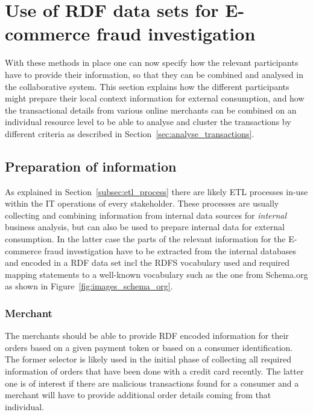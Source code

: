 
\section{Use of \gls{RDF} data sets for \gls{E-commerce} fraud investigation}
\label{sec:working_semantic_data}

With these methods in place one can now specify how the relevant participants have to provide their information, so that they can be combined and analysed in the collaborative system. This section explains how the different participants might prepare their local context information for external consumption, and how the transactional details from various online merchants can be combined on an individual resource level to be able to analyse and cluster the transactions by different criteria as described in Section~\ref{sec:analyse_transactions}.

\subsection{Preparation of information}
\label{subsec:prepare_information}

As explained in Section~\ref{subsec:etl_process} there are likely \gls{ETL} processes in-use within the \gls{IT} operations of every stakeholder. These processes are usually collecting and combining information from internal data sources for \emph{internal} business analysis, but can also be used to prepare internal data for external consumption. In the latter case the parts of the relevant information for the \gls{E-commerce} fraud investigation have to be extracted from the internal databases and encoded in a \gls{RDF} data set \gls{incl} the \gls{RDFS} vocabulary used and required mapping statements to a well-known vocabulary such as the one from Schema.org as shown in Figure~\ref{fig:images_schema_org}.

\subsubsection{Merchant}
\label{subsub:prep_info_merchant}

The merchants should be able to provide \gls{RDF} encoded information for their orders based on a given payment token or based on a consumer identification. The former selector is likely used in the initial phase of collecting all required information of orders that have been done with a credit card recently. The latter one is of interest if there are malicious transactions found for a consumer and a merchant will have to provide additional order details coming from that individual. \\

